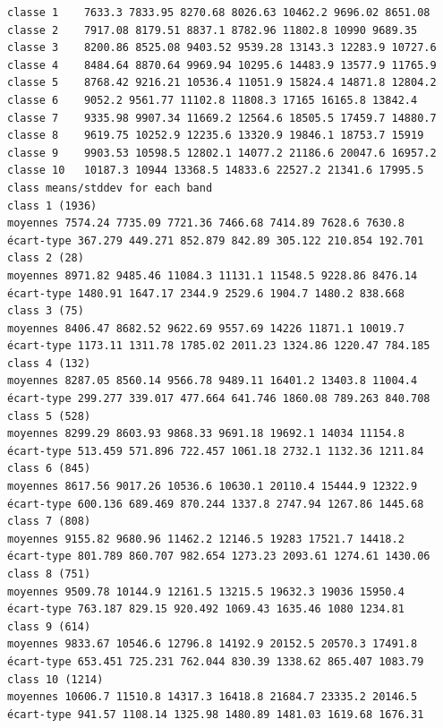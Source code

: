 \documentclass[land,article,submit,pdftex,moreauthors]{Definitions/mdpi}
\begin{document}
\begin{scriptsize}
\begin{verbatim}
classe 1    7633.3 7833.95 8270.68 8026.63 10462.2 9696.02 8651.08
classe 2    7917.08 8179.51 8837.1 8782.96 11802.8 10990 9689.35
classe 3    8200.86 8525.08 9403.52 9539.28 13143.3 12283.9 10727.6
classe 4    8484.64 8870.64 9969.94 10295.6 14483.9 13577.9 11765.9
classe 5    8768.42 9216.21 10536.4 11051.9 15824.4 14871.8 12804.2
classe 6    9052.2 9561.77 11102.8 11808.3 17165 16165.8 13842.4
classe 7    9335.98 9907.34 11669.2 12564.6 18505.5 17459.7 14880.7
classe 8    9619.75 10252.9 12235.6 13320.9 19846.1 18753.7 15919
classe 9    9903.53 10598.5 12802.1 14077.2 21186.6 20047.6 16957.2
classe 10   10187.3 10944 13368.5 14833.6 22527.2 21341.6 17995.5
class means/stddev for each band
class 1 (1936)
moyennes 7574.24 7735.09 7721.36 7466.68 7414.89 7628.6 7630.8
écart-type 367.279 449.271 852.879 842.89 305.122 210.854 192.701
class 2 (28)
moyennes 8971.82 9485.46 11084.3 11131.1 11548.5 9228.86 8476.14
écart-type 1480.91 1647.17 2344.9 2529.6 1904.7 1480.2 838.668
class 3 (75)
moyennes 8406.47 8682.52 9622.69 9557.69 14226 11871.1 10019.7
écart-type 1173.11 1311.78 1785.02 2011.23 1324.86 1220.47 784.185
class 4 (132)
moyennes 8287.05 8560.14 9566.78 9489.11 16401.2 13403.8 11004.4
écart-type 299.277 339.017 477.664 641.746 1860.08 789.263 840.708
class 5 (528)
moyennes 8299.29 8603.93 9868.33 9691.18 19692.1 14034 11154.8
écart-type 513.459 571.896 722.457 1061.18 2732.1 1132.36 1211.84
class 6 (845)
moyennes 8617.56 9017.26 10536.6 10630.1 20110.4 15444.9 12322.9
écart-type 600.136 689.469 870.244 1337.8 2747.94 1267.86 1445.68
class 7 (808)
moyennes 9155.82 9680.96 11462.2 12146.5 19283 17521.7 14418.2
écart-type 801.789 860.707 982.654 1273.23 2093.61 1274.61 1430.06
class 8 (751)
moyennes 9509.78 10144.9 12161.5 13215.5 19632.3 19036 15950.4
écart-type 763.187 829.15 920.492 1069.43 1635.46 1080 1234.81
class 9 (614)
moyennes 9833.67 10546.6 12796.8 14192.9 20152.5 20570.3 17491.8
écart-type 653.451 725.231 762.044 830.39 1338.62 865.407 1083.79
class 10 (1214)
moyennes 10606.7 11510.8 14317.3 16418.8 21684.7 23335.2 20146.5
écart-type 941.57 1108.14 1325.98 1480.89 1481.03 1619.68 1676.31


\end{verbatim}
\end{scriptsize}
\end{document}
